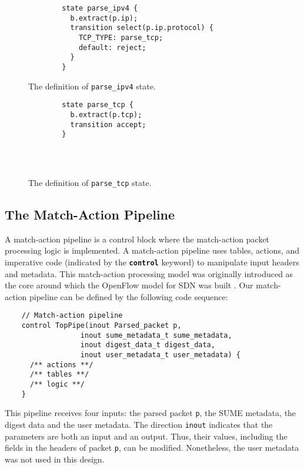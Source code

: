 \begin{figure}[!h]
	\begin{minipage}{.48\textwidth}
		{\renewcommand{\baselinestretch}{0.8}\small
		\begin{verbatim}
		state parse_ipv4 {
		  b.extract(p.ip);
		  transition select(p.ip.protocol) {
		    TCP_TYPE: parse_tcp;
		    default: reject;
		  }
		}
		\end{verbatim}
		}
 		\caption{The definition of \texttt{parse\_ipv4} state.}
 		\label{parseipv4}
	\end{minipage}
	\hfill
	\begin{minipage}{.48\textwidth}
		{\renewcommand{\baselinestretch}{0.8}\small
		\begin{verbatim}
		state parse_tcp {
		  b.extract(p.tcp);
		  transition accept;
		}
		    
		    
		    
		\end{verbatim}
		}	
		\caption{The definition of \texttt{parse\_tcp} state.}
		\label{parsetcp}
	\end{minipage}
\end{figure}
		
	\subsection{The Match-Action Pipeline}
A match-action pipeline is a control block where the match-action packet processing logic is implemented. A match-action pipeline uses tables, actions, and imperative code (indicated by the \textbf{\texttt{control}} keyword) to manipulate input headers and metadata. This match-action processing model was originally introduced as the core around which the OpenFlow model for SDN was built \cite{}. Our match-action pipeline can be defined by the following code sequence:

{\renewcommand{\baselinestretch}{0.8}\small
	\begin{verbatim}
    // Match-action pipeline
    control TopPipe(inout Parsed_packet p,
                  inout sume_metadata_t sume_metadata, 
                  inout digest_data_t digest_data, 
                  inout user_metadata_t user_metadata) {
      /** actions **/
      /** tables **/
      /** logic **/          
    }
	\end{verbatim}
}

This pipeline receives four inputs: the parsed packet \texttt{p}, the SUME metadata, the digest data and the user metadata. The direction \texttt{inout} indicates that the parameters are both an input and an output. Thus, their values, including the fields in the headers of packet \texttt{p}, can be modified. Nonetheless, the user metadata was not used in this design.

